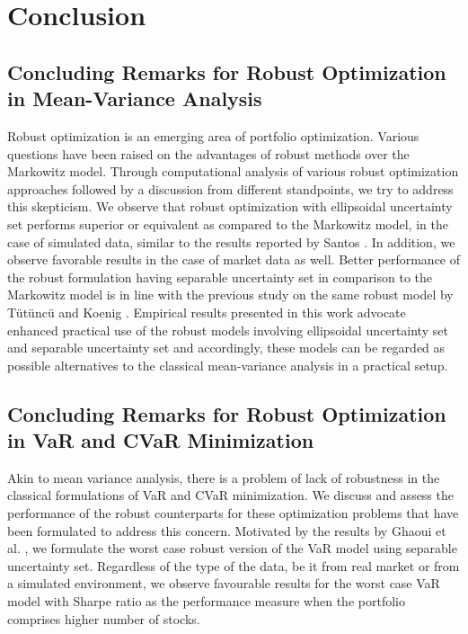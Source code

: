 \chapter{Conclusion}

\section{Concluding Remarks for Robust Optimization in Mean-Variance Analysis}


Robust optimization is an emerging area of portfolio optimization. Various questions have been raised on the advantages of robust methods over the Markowitz model. Through computational analysis of various robust optimization approaches followed by a discussion from different standpoints, we try to address this skepticism. We observe that robust optimization with ellipsoidal uncertainty set performs superior or equivalent as compared to the Markowitz model, in the case of simulated data, similar to the results reported by Santos \cite{santos}. In addition, we observe favorable results in the case of market data as well. Better performance of the robust formulation having separable uncertainty set in comparison to the Markowitz model is in line with the previous study on the same robust model by T{\"u}t{\"u}nc{\"u} and Koenig \cite{tutuncu}. Empirical results presented in this work advocate enhanced practical use of the robust models involving ellipsoidal uncertainty set and separable uncertainty set and accordingly, these models can be regarded as possible alternatives to the classical mean-variance analysis in a practical setup.

\section{Concluding Remarks for Robust Optimization in VaR and CVaR Minimization}

Akin to mean variance analysis, there is a problem of lack of robustness in the classical formulations of VaR and CVaR minimization. We discuss and assess the performance of the robust counterparts for these optimization problems that have been formulated to address this concern. Motivated by the results by Ghaoui et al. \cite{ghaoui03}, we formulate the worst case robust version of the VaR model using separable uncertainty set. Regardless of the type of the data, be it from real market or from a simulated environment, we observe favourable results for the worst case VaR model with Sharpe ratio as the performance measure when the portfolio comprises higher number of stocks. 

